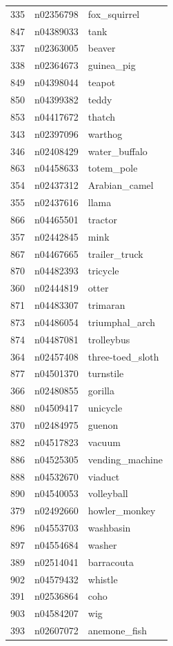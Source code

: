\begin{table}
\begin{tabular}{cll}
335 & n02356798 & fox_squirrel \\
847 & n04389033 & tank \\
337 & n02363005 & beaver \\
338 & n02364673 & guinea_pig \\
849 & n04398044 & teapot \\
850 & n04399382 & teddy \\
853 & n04417672 & thatch \\
343 & n02397096 & warthog \\
346 & n02408429 & water_buffalo \\
863 & n04458633 & totem_pole \\
354 & n02437312 & Arabian_camel \\
355 & n02437616 & llama \\
866 & n04465501 & tractor \\
357 & n02442845 & mink \\
867 & n04467665 & trailer_truck \\
870 & n04482393 & tricycle \\
360 & n02444819 & otter \\
871 & n04483307 & trimaran \\
873 & n04486054 & triumphal_arch \\
874 & n04487081 & trolleybus \\
364 & n02457408 & three-toed_sloth \\
877 & n04501370 & turnstile \\
366 & n02480855 & gorilla \\
880 & n04509417 & unicycle \\
370 & n02484975 & guenon \\
882 & n04517823 & vacuum \\
886 & n04525305 & vending_machine \\
888 & n04532670 & viaduct \\
890 & n04540053 & volleyball \\
379 & n02492660 & howler_monkey \\
896 & n04553703 & washbasin \\
897 & n04554684 & washer \\
389 & n02514041 & barracouta \\
902 & n04579432 & whistle \\
391 & n02536864 & coho \\
903 & n04584207 & wig \\
393 & n02607072 & anemone_fish \\

\end{tabular}
\end{table}
